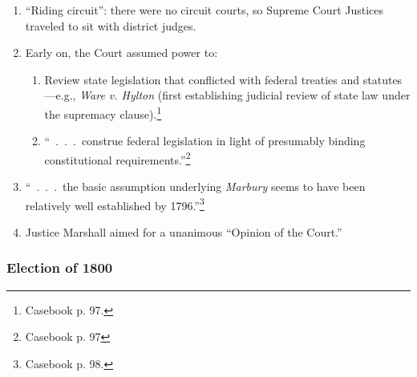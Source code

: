 \begin{enumerate}
    \item ``Riding circuit'': there were no circuit courts, so Supreme Court 
    Justices traveled to sit with district judges.
    \item Early on, the Court assumed power to:
    \begin{enumerate}
        \item Review state legislation that conflicted with 
        federal treaties and statutes---e.g., \emph{Ware v. Hylton} (first 
        establishing judicial review of state law under the supremacy 
        clause).\footnote{Casebook p. 97.}
        \item ``~.~.~.~construe federal legislation in light of 
        presumably binding constitutional requirements.''\footnote{Casebook p. 
        97}
    \end{enumerate}
    \item ``~.~.~.~the basic assumption underlying \emph{Marbury} seems to 
    have been relatively well established by 1796.''\footnote{Casebook p. 98.}
    \item Justice Marshall aimed for a unanimous ``Opinion of the Court.''
\end{enumerate}

\subsubsection{Election of 1800}

